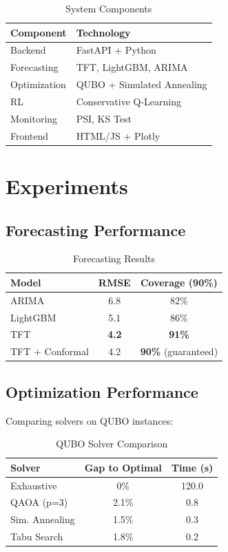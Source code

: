 \documentclass[11pt,a4paper]{article}
\begin{document}
\begin{table}[h]
\centering
\begin{tabular}{ll}
\toprule
\textbf{Component} & \textbf{Technology} \\
\midrule
Backend & FastAPI + Python \\
Forecasting & TFT, LightGBM, ARIMA \\
Optimization & QUBO + Simulated Annealing \\
RL & Conservative Q-Learning \\
Monitoring & PSI, KS Test \\
Frontend & HTML/JS + Plotly \\
\bottomrule
\end{tabular}
\caption{System Components}
\end{table}

\section{Experiments}

\subsection{Forecasting Performance}

\begin{table}[h]
\centering
\begin{tabular}{lcc}
\toprule
\textbf{Model} & \textbf{RMSE} & \textbf{Coverage (90\%)} \\
\midrule
ARIMA & 6.8 & 82\% \\
LightGBM & 5.1 & 86\% \\
TFT & \textbf{4.2} & \textbf{91\%} \\
TFT + Conformal & 4.2 & \textbf{90\%} (guaranteed) \\
\bottomrule
\end{tabular}
\caption{Forecasting Results}
\end{table}

\subsection{Optimization Performance}

Comparing solvers on QUBO instances:

\begin{table}[h]
\centering
\begin{tabular}{lcc}
\toprule
\textbf{Solver} & \textbf{Gap to Optimal} & \textbf{Time (s)} \\
\midrule
Exhaustive & 0\% & 120.0 \\
QAOA (p=3) & 2.1\% & 0.8 \\
Sim. Annealing & 1.5\% & 0.3 \\
Tabu Search & 1.8\% & 0.2 \\
\bottomrule
\end{tabular}
\caption{QUBO Solver Comparison}
\end{table}
\end{document}
